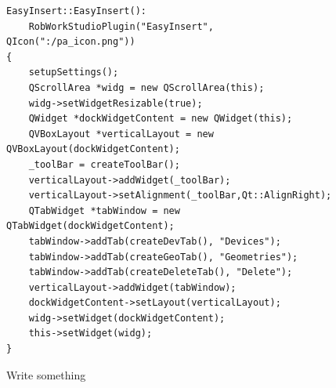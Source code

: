 \begin{figure}[h] %
\centering
\lstset{language=C++} 
\begin{lstlisting}[frame=single]  
EasyInsert::EasyInsert():
    RobWorkStudioPlugin("EasyInsert", QIcon(":/pa_icon.png"))
{
    setupSettings();
    QScrollArea *widg = new QScrollArea(this);
	widg->setWidgetResizable(true);
	QWidget *dockWidgetContent = new QWidget(this);
	QVBoxLayout *verticalLayout = new QVBoxLayout(dockWidgetContent);
    _toolBar = createToolBar();
    verticalLayout->addWidget(_toolBar);
    verticalLayout->setAlignment(_toolBar,Qt::AlignRight);
    QTabWidget *tabWindow = new QTabWidget(dockWidgetContent);
    tabWindow->addTab(createDevTab(), "Devices");
    tabWindow->addTab(createGeoTab(), "Geometries");
    tabWindow->addTab(createDeleteTab(), "Delete");
    verticalLayout->addWidget(tabWindow);
    dockWidgetContent->setLayout(verticalLayout);
    widg->setWidget(dockWidgetContent);
	this->setWidget(widg);
}
\end{lstlisting}
\caption{Write something}
\label{fig:eiClass} 	
\end{figure}

%
%
%
%

